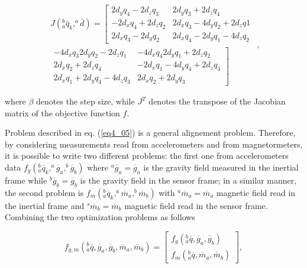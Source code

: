 \begin{equation}
\label{eq4_13}
\begin{split}
J(^b_a \bar{q}_k, ^a \bar{d}) =
\left [ \begin{array}{cc}
2d_yq_4 - 2d_zq_3 & 2d_yq_3+ 2d_zq_4\\
-2d_xq_4 + 2d_zq_2 & 2d_xq_3 - 4d_yq_2 + 2d_zq1 \\
2d_xq_3 - 2d_yq_2 & 2d_xq_4 - 2d_yq_1 - 4d_zq_2 \end{array} \right. \\
\left. \begin{array}{rr}
-4d_x q_3 2d_y q_2 - 2d_z q_1 & -4d_x q_4 2d_y q_1 + 2d_z q_2\\
2d_x q_2 + 2d_z q_4 &  -2d_x q_1 - 4d_y q_4 + 2d_z q_3\\
2d_x q_1 + 2 d_y q_4 - 4 d_z q_3 & 2 d_x q_2 + 2d_y q_3
\end{array} \right ] \end{split},
\end{equation}

\noindent where $\beta$ denotes the step size, while $J^T$ denotes the transpose of the Jacobian matrix of the objective function $f$.

Problem described in eq. (\ref{eq4_05}) is a general alignement problem. Therefore, by considering measurements read from accelerometers and from magnetormeters, it is possible to write two different problems: the first one from accelerometers data $f_g(^b_a \overline{q}_k, ^a \overline{g}_a, ^b \overline{g}_b)$ where $^a\overline{g}_a = \overline{g}_a$ is the gravity field measured in the inertial frame while $^b \overline{g}_b = \overline{g}_b$ is the gravity field in the sensor frame; in a similar manner, the second problem is $f_m(^b_a \overline{q}_k, ^a \overline{m}_a, ^b \overline{m}_b)$ with $^a\overline{m}_a = \overline{m}_a$ magnetic field read in the inertial frame and $^s \overline{m}_b = \overline{m}_b$ magnetic field read in the sensor frame.
Combining the two optimization problems as follows

\begin{equation}
\label{eq4_14}
f_{g,m}(^b_a \overline{q},\overline{g}_a,\overline{g}_b,\overline{m}_a,\overline{m}_b) = \left [ \begin{array}{c} f_g(^b_a \overline{q}, \overline{g}_a, \overline{g}_b) \\  f_m(^b_a \overline{q},  \overline{m}_a,  \overline{m}_b) \end{array} \right ],
\end{equation}

